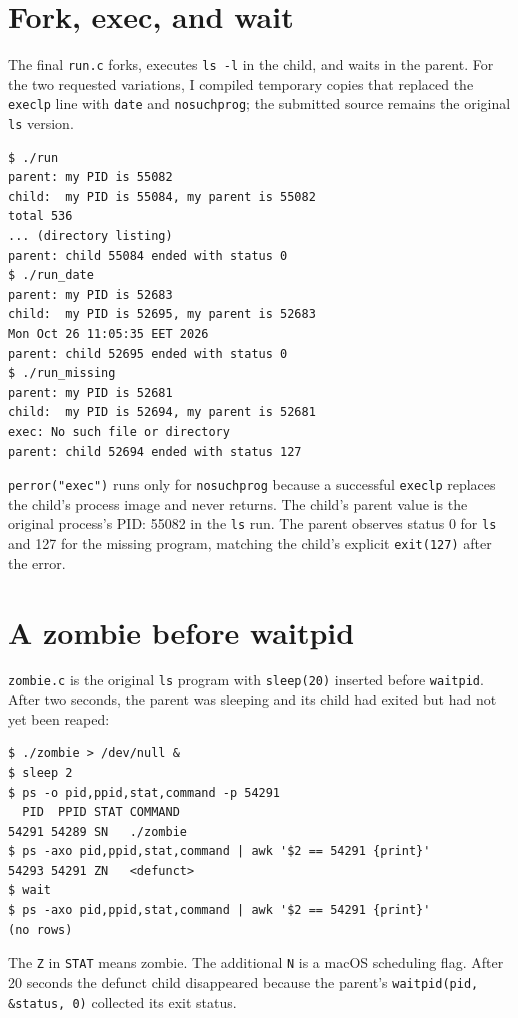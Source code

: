\documentclass[12pt]{article}
\begin{document}
\section{Fork, exec, and wait}
The final \texttt{run.c} forks, executes \texttt{ls -l} in the child, and
waits in the parent. For the two requested variations, I compiled temporary
copies that replaced the \texttt{execlp} line with \texttt{date} and
\texttt{nosuchprog}; the submitted source remains the original \texttt{ls}
version.

\begin{lstlisting}
$ ./run
parent: my PID is 55082
child:  my PID is 55084, my parent is 55082
total 536
... (directory listing)
parent: child 55084 ended with status 0
$ ./run_date
parent: my PID is 52683
child:  my PID is 52695, my parent is 52683
Mon Oct 26 11:05:35 EET 2026
parent: child 52695 ended with status 0
$ ./run_missing
parent: my PID is 52681
child:  my PID is 52694, my parent is 52681
exec: No such file or directory
parent: child 52694 ended with status 127
\end{lstlisting}

\texttt{perror("exec")} runs only for \texttt{nosuchprog} because a successful
\texttt{execlp} replaces the child's process image and never returns. The
child's parent value is the original process's PID: 55082 in the \texttt{ls}
run. The parent observes status 0 for \texttt{ls} and 127 for the missing
program, matching the child's explicit \texttt{exit(127)} after the error.

\clearpage
\section{A zombie before waitpid}
\texttt{zombie.c} is the original \texttt{ls} program with
\texttt{sleep(20)} inserted before \texttt{waitpid}. After two seconds, the
parent was sleeping and its child had exited but had not yet been reaped:

\begin{lstlisting}
$ ./zombie > /dev/null &
$ sleep 2
$ ps -o pid,ppid,stat,command -p 54291
  PID  PPID STAT COMMAND
54291 54289 SN   ./zombie
$ ps -axo pid,ppid,stat,command | awk '$2 == 54291 {print}'
54293 54291 ZN   <defunct>
$ wait
$ ps -axo pid,ppid,stat,command | awk '$2 == 54291 {print}'
(no rows)
\end{lstlisting}

The \texttt{Z} in \texttt{STAT} means zombie. The additional \texttt{N} is a
macOS scheduling flag. After 20 seconds the defunct child disappeared because
the parent's \texttt{waitpid(pid, \&status, 0)} collected its exit status.
\end{document}
